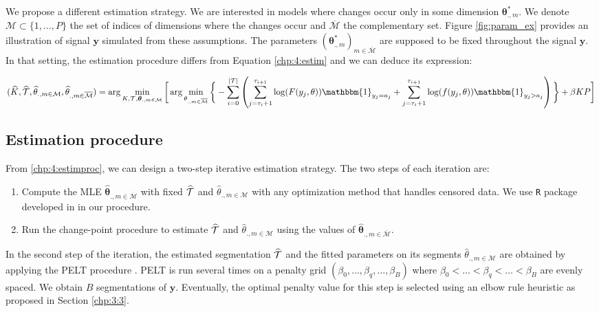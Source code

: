 We propose a different estimation strategy. We are interested in models where changes occur only in some dimension $\bm\theta^*_{.,m}$. We denote $\mathcal{M} \subset \{1,\dots,P\}$ the set of indices of dimensions where the changes occur and $\overline{\mathcal{M}}$ the complementary set. Figure \ref{fig:param_ex} provides an illustration of signal $\bm y$ simulated from these assumptions. The parameters $(\bm\theta^*_{.,m})_{m \in \overline{\mathcal{M}}}$ are supposed to be fixed throughout the signal $\bm y$. In that setting, the estimation procedure differs from Equation \ref{chp:4:estim} and we can deduce its expression: 
    
\begin{dmath}\label{chp:4:estimproc}
(\widehat{K},\widehat{\TT},\widehat{\theta}_{.,m\in\mathcal{M}},\widehat{\theta}_{.,m\in\overline{\mathcal{M}}}) = \arg\min_{K,\TT,\bm \theta_{.,m\in\mathcal{M}}}\bigg[\arg\min_{\theta_{.,m\in\overline{\mathcal{M}}}}\bigg\{ - \sum_{i=0}^{\lvert \TT \rvert}  \left(\sum_{j=\tau_i+1}^{\tau_{i+1}}\log(F(y_j,\theta))\mathbbm{1}_{y_j=a_j}+\sum_{j=\tau_i+1}^{\tau_{i+1}}\log(f(y_j,\theta))\mathbbm{1}_{y_j>a_j}\right)\bigg\}+\beta KP \bigg]
\end{dmath}

\subsection{Estimation procedure}

From \ref{chp:4:estimproc}, we can design a two-step iterative estimation strategy. The two steps of each iteration are:
\begin{enumerate}
\item Compute the MLE $\widehat{\bm\theta}_{{.,m\in\overline{\mathcal{M}}}}$ with fixed $\widehat{{\mathcal T}}$ and $\widehat{\theta}_{.,m\in\mathcal{M}}$ with any optimization method that handles censored data. We use \texttt{R} package developed in \cite{delignette2015} in our procedure.  
\item Run the change-point procedure to estimate $\widehat{{\mathcal T}}$ and $\widehat{\theta}_{.,m\in\mathcal{M}}$ using the values of $\widehat{\bm\theta}_{{.,m\in\overline{\mathcal{M}}}}$.
\end{enumerate} 

In the second step of the iteration, the estimated segmentation $\widehat{{\mathcal T}}$ and the fitted parameters on its segments $\widehat{\theta}_{.,m\in\mathcal{M}}$ are obtained by applying the PELT procedure \citep{Killick2012}. PELT is run several times on a penalty grid $(\beta_0,\dots,\beta_q,\dots,\beta_{B})$ where $\beta_0<\dots<\beta_{q}<\dots<\beta_{B}$ are evenly spaced. We obtain $B$ segmentations of $\bm{y}$. Eventually, the optimal penalty value for this step is selected using an elbow rule heuristic as proposed in Section \ref{chp:3:3}.

